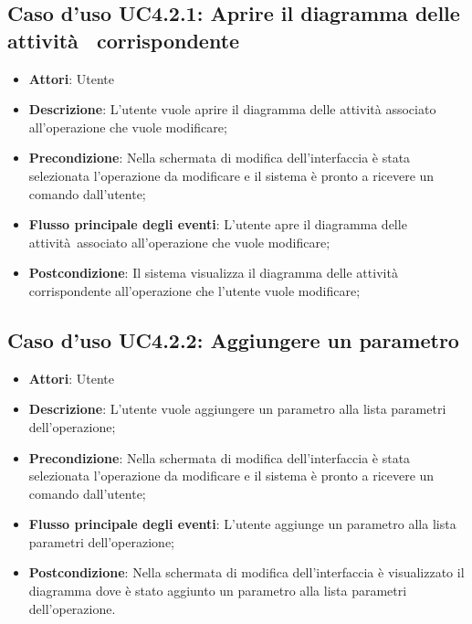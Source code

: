\documentclass[../AnalisiDeiRequisiti.tex]{subfiles}
\begin{document}
			\subsection{Caso d'uso UC4.2.1: Aprire il diagramma delle attività  corrispondente}
			\begin{itemize}
				\item \textbf{Attori}: Utente
				\item \textbf{Descrizione}: L'utente vuole aprire il diagramma delle attività associato all'operazione che vuole modificare;
				\item \textbf{Precondizione}: Nella schermata di modifica dell'interfaccia è stata selezionata l'operazione da modificare e il sistema è pronto a ricevere un comando dall'utente;
				\item \textbf{Flusso principale degli eventi}: L'utente apre il diagramma delle attività associato all'operazione che vuole modificare;
				\item \textbf{Postcondizione}: Il sistema visualizza il diagramma delle attività corrispondente all'operazione che l'utente vuole modificare;
			\end{itemize}
			\subsection{Caso d'uso UC4.2.2: Aggiungere un parametro}
			\begin{itemize}
				\item \textbf{Attori}: Utente
				\item \textbf{Descrizione}: L'utente vuole aggiungere un parametro alla lista parametri dell'operazione;
				\item \textbf{Precondizione}: Nella schermata di modifica dell'interfaccia è stata selezionata l'operazione da modificare e il sistema è pronto a ricevere un comando dall'utente;
				\item \textbf{Flusso principale degli eventi}: L'utente aggiunge un parametro alla lista parametri dell'operazione;
				\item \textbf{Postcondizione}: Nella schermata di modifica dell'interfaccia è visualizzato il diagramma dove è stato aggiunto un parametro alla lista parametri dell'operazione.
			\end{itemize}
\end{document}
